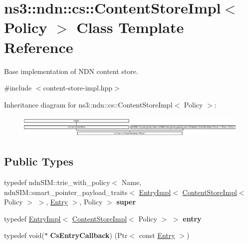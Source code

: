 \hypertarget{classns3_1_1ndn_1_1cs_1_1ContentStoreImpl}{}\section{ns3\+:\+:ndn\+:\+:cs\+:\+:Content\+Store\+Impl$<$ Policy $>$ Class Template Reference}
\label{classns3_1_1ndn_1_1cs_1_1ContentStoreImpl}


Base implementation of N\+DN content store.  




{\ttfamily \#include $<$content-\/store-\/impl.\+hpp$>$}

Inheritance diagram for ns3\+:\+:ndn\+:\+:cs\+:\+:Content\+Store\+Impl$<$ Policy $>$\+:\begin{figure}[H]
\begin{center}
\leavevmode
\includegraphics[height=1.083871cm]{classns3_1_1ndn_1_1cs_1_1ContentStoreImpl}
\end{center}
\end{figure}
\subsection*{Public Types}
\begin{DoxyCompactItemize}
\item 
typedef ndn\+S\+I\+M\+::trie\+\_\+with\+\_\+policy$<$ Name, ndn\+S\+I\+M\+::smart\+\_\+pointer\+\_\+payload\+\_\+traits$<$ \hyperlink{classns3_1_1ndn_1_1cs_1_1EntryImpl}{Entry\+Impl}$<$ \hyperlink{classns3_1_1ndn_1_1cs_1_1ContentStoreImpl}{Content\+Store\+Impl}$<$ Policy $>$ $>$, \hyperlink{classns3_1_1ndn_1_1cs_1_1Entry}{Entry} $>$, Policy $>$ {\bfseries super}\hypertarget{classns3_1_1ndn_1_1cs_1_1ContentStoreImpl_a7613ce1a12718ac8b2bd3c5f9fee86d9}{}\label{classns3_1_1ndn_1_1cs_1_1ContentStoreImpl_a7613ce1a12718ac8b2bd3c5f9fee86d9}

\item 
typedef \hyperlink{classns3_1_1ndn_1_1cs_1_1EntryImpl}{Entry\+Impl}$<$ \hyperlink{classns3_1_1ndn_1_1cs_1_1ContentStoreImpl}{Content\+Store\+Impl}$<$ Policy $>$ $>$ {\bfseries entry}\hypertarget{classns3_1_1ndn_1_1cs_1_1ContentStoreImpl_a1c2bef1c594ea1a292d178536ff4e9b5}{}\label{classns3_1_1ndn_1_1cs_1_1ContentStoreImpl_a1c2bef1c594ea1a292d178536ff4e9b5}

\item 
typedef void($\ast$ {\bfseries Cs\+Entry\+Callback}) (Ptr$<$ const \hyperlink{classns3_1_1ndn_1_1cs_1_1Entry}{Entry} $>$)\hypertarget{classns3_1_1ndn_1_1cs_1_1ContentStoreImpl_a909231a206746971cf5f3cfd1aed9298}{}\label{classns3_1_1ndn_1_1cs_1_1ContentStoreImpl_a909231a206746971cf5f3cfd1aed9298}

\end{DoxyCompactItemize}
